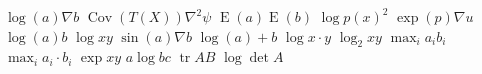 \documentclass{article}
\begin{document}
$\log(a)\nabla b$ $\operatorname{Cov}(T(X))\nabla^{2}\psi$ $\operatorname{E}(a)\operatorname{E}(b)$ $\log p(x)^{2}$
$\exp(p)\nabla u$ $\log(a)b$ $\log x y$ $\sin(a)\nabla b$ $\log(a)+b$
$\log x\cdot y$ $\log_2 x y$ $\max_i a_i b_i$ $\max_i a_i\cdot b_i$ $\exp x y$ $a\log b c$ $\operatorname{tr} AB$ $\log\det A$
\end{document}
